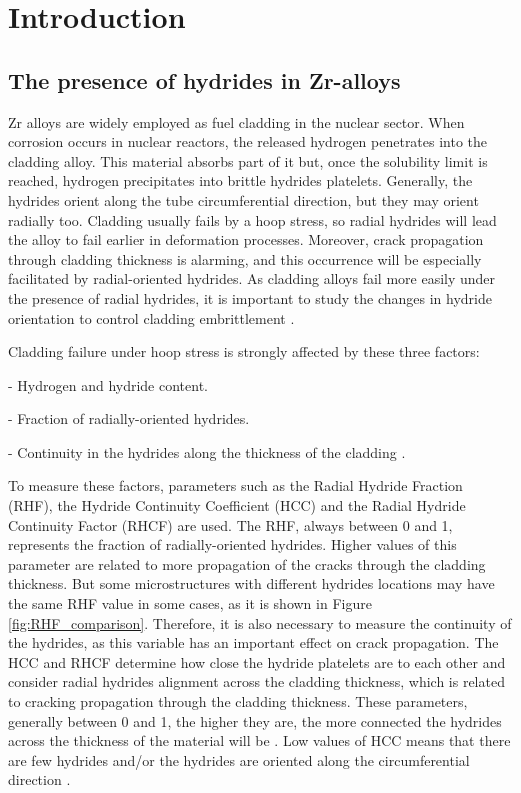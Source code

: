 \section{Introduction}

\subsection{The presence of hydrides in Zr-alloys}

\justify
\noindent
Zr alloys are widely employed as fuel cladding in the nuclear sector. When corrosion occurs in nuclear reactors, the released hydrogen penetrates into the cladding alloy. This material absorbs part of it but, once the solubility limit is reached, hydrogen precipitates into brittle hydrides platelets. Generally, the hydrides orient along the tube circumferential direction, but they may orient radially too. Cladding usually fails by a hoop stress, so radial hydrides will lead the alloy to fail earlier in deformation processes. Moreover, crack propagation through cladding thickness is alarming, and this occurrence will be especially facilitated by radial-oriented hydrides. As cladding alloys fail more easily under the presence of radial hydrides, it is important to study the changes in hydride orientation to control cladding embrittlement \cite{SIMON2021152817, COLAS2013586, SHARMA2018546, SUNIL2020152457}.

\noindent
Cladding failure under hoop stress is strongly  affected by these three factors:

\vspace{0.1 mm}
- Hydrogen and hydride content.

\vspace{0.1 mm}
- Fraction of radially-oriented hydrides.

\vspace{0.1 mm}
- Continuity in the hydrides along the thickness of the cladding \cite{SIMON2021152817}.

\noindent
To measure these factors, parameters such as the Radial Hydride Fraction (RHF), the Hydride Continuity Coefficient (HCC) and the Radial Hydride Continuity Factor (RHCF) are used. The RHF, always between 0 and 1, represents the fraction of radially-oriented hydrides. Higher values of this parameter are related to more propagation of the cracks through the cladding thickness. But some microstructures with different hydrides locations may have the same RHF value in some cases, as it is shown in Figure \ref{fig:RHF_comparison}. Therefore, it is also necessary to measure the continuity of the hydrides, as this variable has an important effect on crack propagation. The HCC and RHCF determine how close the hydride platelets are to each other and consider radial hydrides alignment across the cladding thickness, which is related to cracking propagation through the cladding thickness. These parameters, generally between 0 and 1, the higher they are, the more connected the hydrides across the thickness of the material will be \cite{SIMON2021152817}. Low values of HCC means that there are few hydrides and/or the hydrides are oriented along the circumferential direction \cite{SHARMA2018546}.

